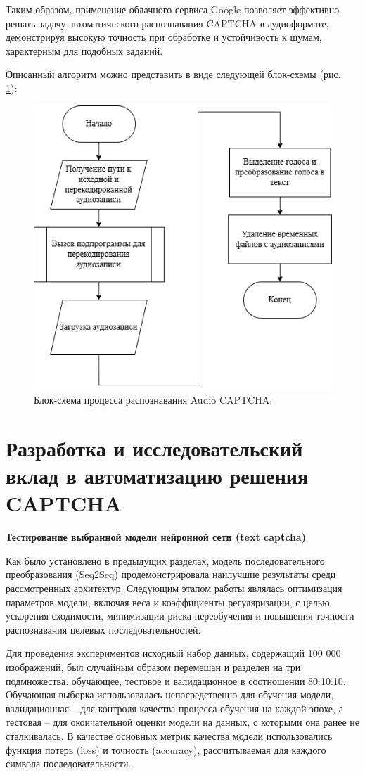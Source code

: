 Таким образом, применение облачного сервиса Google позволяет эффективно решать 
задачу автоматического распознавания CAPTCHA в аудиоформате, демонстрируя высокую 
точность при обработке и устойчивость к шумам, характерным для подобных заданий.

Описанный алгоритм можно представить в виде следующей блок-схемы (рис.~
\ref{fig:recognize-audio}):

\begin{figure}[H]
    \centering
    \includegraphics[width=0.6\linewidth]{
        imgs/audiocaptcha/recognize_audiocaptcha.png
    }
    \caption{Блок-схема процесса распознавания Audio CAPTCHA.}
    \label{fig:recognize-audio}
\end{figure}

\section{Разработка и исследовательский вклад в автоматизацию решения CAPTCHA}

\textbf{Тестирование выбранной модели нейронной сети (text captcha)}

Как было установлено в предыдущих разделах, модель последовательного 
преобразования (Seq2Seq) продемонстрировала наилучшие результаты среди 
рассмотренных архитектур. Следующим этапом работы являлась оптимизация параметров 
модели, включая веса и коэффициенты регуляризации, с целью ускорения сходимости, 
минимизации риска переобучения и повышения точности распознавания целевых 
последовательностей.

Для проведения экспериментов исходный набор данных, содержащий 100 000 
изображений, был случайным образом перемешан и разделен на три подмножества: 
обучающее, тестовое и валидационное в соотношении 80:10:10. Обучающая выборка 
использовалась непосредственно для обучения модели, валидационная -- для контроля 
качества процесса обучения на каждой эпохе, а тестовая -- для окончательной 
оценки модели на данных, с которыми она ранее не сталкивалась. В качестве 
основных метрик качества модели использовались функция потерь (loss) и точность 
(accuracy), рассчитываемая для каждого символа последовательности.

